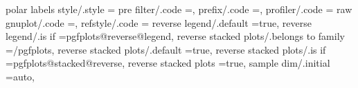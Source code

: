 {{{{{{{{{{{{{{{{{{{{{{{{{{{{{{{{{{{{{{{{polar labels style/.style                                          ={%
pre filter/.code                                                   ={},                                                                                                                                
prefix/.code                                                       ={},                                                   
profiler/.code                                                     ={%
raw gnuplot/.code                                                  ={},                                                   
refstyle/.code                                                     ={%
reverse legend/.default                                            =true,                                                                                                                              
reverse legend/.is if                                              =pgfplots@reverse@legend,                                                                                                           
reverse stacked plots/.belongs to family                           =/pgfplots,                                                                                                                         
reverse stacked plots/.default                                     =true,                                                                                                                              
reverse stacked plots/.is if                                       =pgfplots@stacked@reverse,                                                                                                          
reverse stacked plots                                              =true,                                                                                                                              
sample dim/.initial                                                =auto,                                                                                                                              
}}}}}}}}}}}}}}}}}}}}}}}}}}}}}}}}}}}}}}}}}}}
